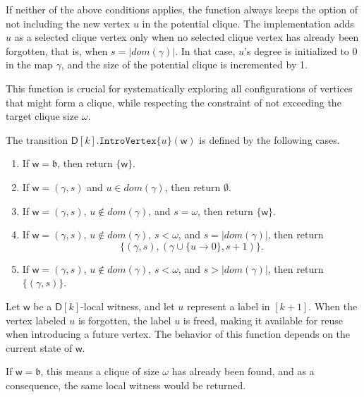 \documentclass[11pt,a4paper]{article}
\newcommand{\treewidthvalue}{k}
\newcommand{\introvertextype}[1]{\mathtt{IntroVertex}\{#1\}}
\newcommand{\vertexone}{u}
\newcommand{\awitness}{\mathsf{w}}
\newcommand{\dpcore}{\mathsf{D}}
\newcommand{\domain}{dom}
\newcommand{\cliqueparameter}{\omega}
\newcommand{\cliquemap}{\gamma}
\newcommand{\cliquesize}{s}
\newcommand{\cliquefound}{\mathfrak{b}}
\begin{document}
{		If neither of the above conditions applies, the function always keeps the option of not including the new vertex \(\vertexone\) in the potential clique. The implementation adds \(\vertexone\) as a selected clique vertex only when no selected clique vertex has already been forgotten, that is, when \(\cliquesize=|\domain(\cliquemap)|\). In that case, \(\vertexone\)'s degree is initialized to 0 in the map \(\cliquemap\), and the size of the potential clique is incremented by 1.

	This function is crucial for systematically exploring all configurations of vertices that might form a clique, while respecting the constraint of not exceeding the target clique size \(\cliqueparameter\).

		The transition $\dpcore[\treewidthvalue].\introvertextype{\vertexone}(\awitness)$ is defined by the following cases.
		\begin{enumerate}
		\item If $\awitness=\cliquefound$, then return $\{\awitness\}$.
		\item If $\awitness=(\cliquemap,\cliquesize)$ and $\vertexone\in\domain(\cliquemap)$, then return $\emptyset$.
		\item If $\awitness=(\cliquemap,\cliquesize)$, $\vertexone\notin\domain(\cliquemap)$, and $\cliquesize=\cliqueparameter$, then return $\{\awitness\}$.
		\item If $\awitness=(\cliquemap,\cliquesize)$, $\vertexone\notin\domain(\cliquemap)$, $\cliquesize<\cliqueparameter$, and $\cliquesize=|\domain(\cliquemap)|$, then return
		\[
		\{(\cliquemap,\cliquesize),(\cliquemap\cup\{\vertexone\to 0\},\cliquesize+1)\}.
		\]
			\item If $\awitness=(\cliquemap,\cliquesize)$, $\vertexone\notin\domain(\cliquemap)$, $\cliquesize<\cliqueparameter$, and $\cliquesize>|\domain(\cliquemap)|$, then return $\{(\cliquemap,\cliquesize)\}$.
			\end{enumerate}

			 Let \(\awitness\) be a \(\dpcore[\treewidthvalue]\)-local witness, and let
		\(\vertexone\) represent a label in $[\treewidthvalue + 1]$. When the vertex labeled \(\vertexone\) is forgotten, the label \(\vertexone\) is freed, making it available for reuse when introducing a future vertex. The behavior of this function depends on the current state of \(\awitness\).

		If \(\awitness = \cliquefound\), this means a clique of size $\cliqueparameter$ has already been found, and as a consequence, the same local witness would be returned.

}
\end{document}
